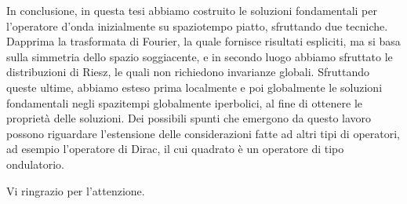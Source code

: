 \documentclass[11pt,a4paper]{article}
\theoremstyle{classicthm}
\theoremstyle{classicthm}
\theoremstyle{definition}
\begin{document}
In conclusione, in questa tesi abbiamo costruito le soluzioni fondamentali per l'operatore d'onda inizialmente su spaziotempo piatto, sfruttando due tecniche. Dapprima la trasformata di Fourier, la quale fornisce risultati espliciti, ma si basa sulla simmetria dello spazio soggiacente, e in secondo luogo abbiamo sfruttato le distribuzioni di Riesz, le quali non richiedono invarianze globali. Sfruttando queste ultime, abbiamo esteso prima localmente e poi globalmente le soluzioni fondamentali negli spazitempi globalmente iperbolici, al fine di ottenere le proprietà delle soluzioni. Dei possibili spunti che emergono da questo lavoro possono riguardare l'estensione delle considerazioni fatte ad altri tipi di operatori, ad esempio l'operatore di Dirac, il cui quadrato è un operatore di tipo ondulatorio.


Vi ringrazio per l'attenzione.
			
			
			
			
			
			
			
			
		
\end{document}
